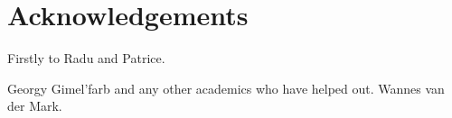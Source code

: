 \chapter*{Acknowledgements}


Firstly to Radu and Patrice.

Georgy Gimel'farb and any other academics who have helped out.  Wannes van der Mark.






